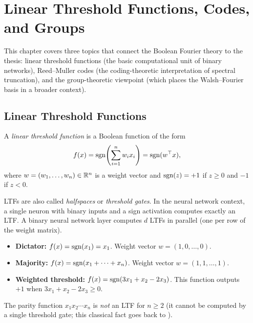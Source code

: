 
\chapter{Linear Threshold Functions, Codes, and Groups}\label{ch:ltf-codes-groups}

This chapter covers three topics that connect the Boolean Fourier theory
to the thesis: linear threshold functions (the basic computational unit
of binary networks), Reed--Muller codes (the coding-theoretic
interpretation of spectral truncation), and the group-theoretic
viewpoint (which places the Walsh--Fourier basis in a broader context).

\section{Linear Threshold Functions}\label{sec:ltf}

\begin{definition}\label{def:ltf}
A \emph{linear threshold function} is a Boolean function of the form
\begin{equation}\label{eq:ltf}
  f(x) = \operatorname{sgn}\!\left(\sum_{i=1}^n w_i x_i\right)
  = \operatorname{sgn}(w^\top x),
\end{equation}
where $w = (w_1, \ldots, w_n) \in \mathbb{R}^n$ is a weight vector and
$\operatorname{sgn}(z) = +1$ if $z \geq 0$ and $-1$ if $z < 0$.
\end{definition}

LTFs are also called \emph{halfspaces} or \emph{threshold gates}.
In the neural network context, a single neuron with binary inputs and a
sign activation computes exactly an LTF. A binary neural network layer
computes $d$ LTFs in parallel (one per row of the weight matrix).

\begin{example}\label{ex:ltf-examples}
\begin{itemize}
  \item \textbf{Dictator:} $f(x) = \operatorname{sgn}(x_1) = x_1$. Weight vector
    $w = (1, 0, \ldots, 0)$.
  \item \textbf{Majority:} $f(x) = \operatorname{sgn}(x_1 + \cdots + x_n)$. Weight
    vector $w = (1, 1, \ldots, 1)$.
  \item \textbf{Weighted threshold:} $f(x) = \operatorname{sgn}(3x_1 + x_2 - 2x_3)$.
    This function outputs $+1$ when $3x_1 + x_2 - 2x_3 \geq 0$.
\end{itemize}
The parity function $x_1 x_2 \cdots x_n$ is \emph{not} an LTF for
$n \geq 2$ (it cannot be computed by a single threshold gate; this
classical fact goes back to \citealp{minsky1969perceptrons}).
\end{example}


